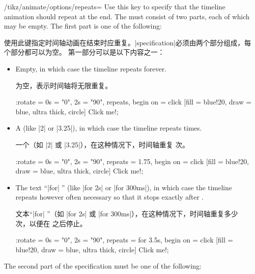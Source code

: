 \begin{key}{/tikz/animate/options/repeats=}
    Use this key to specify that the timeline animation should repeat at the
    end. The  must consist of two parts, each of which may
    be empty. The first part is one of the following:
    
    使用此键指定时间轴动画在结束时应重复。|specification|必须由两个部分组成，每个部分都可以为空。
    第一部分可以是以下内容之一：

    \begin{itemize}
        \item Empty, in which case the timeline repeats forever.
            
        为空，表示时间轴将无限重复。

\begin{codeexample}[
    preamble={\usetikzlibrary{animations}},
    animation list={1,2,3,4,5},
]
\tikz \node :rotate = { 0s = "0", 2s = "90",
                        repeats, begin on = click }
    [fill = blue!20, draw = blue, ultra thick, circle] {Click me!};
\end{codeexample}
        \item A  (like |2| or |3.25|), in which case the timeline
            repeats  times.
            
            一个（如 |2| 或 |3.25|），在这种情况下，时间轴重复  次。
\begin{codeexample}[
    preamble={\usetikzlibrary{animations}},
    animation list={1,2,3,4,5},
]
\tikz \node :rotate = { 0s = "0", 2s = "90",
                        repeats = 1.75, begin on = click }
    [fill = blue!20, draw = blue, ultra thick, circle] {Click me!};
\end{codeexample}
        \item The text ``|for| '' (like |for 2s| or |for 300ms|), in
            which case the timeline repeats however often necessary so that it
            stops exactly after .
            
            文本“|for| ”（如 |for 2s| 或 |for 300ms|），在这种情况下，时间轴重复多少次，以便在  之后停止。
\begin{codeexample}[
    preamble={\usetikzlibrary{animations}},
    animation list={1,2,3,4,5},
]
\tikz \node :rotate = { 0s = "0", 2s = "90",
                        repeats = for 3.5s, begin on = click }
    [fill = blue!20, draw = blue, ultra thick, circle] {Click me!};
\end{codeexample}
    \end{itemize}
    The second part of the specification must be one of the following:
    

\end{key}
